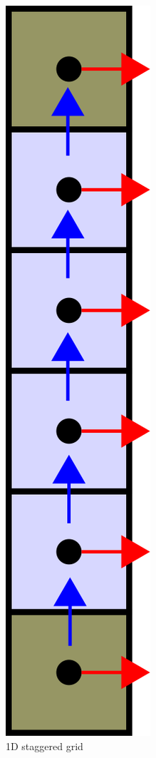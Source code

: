 \documentclass[12pt]{article}
\begin{document}
\begin{figure}[H]
    \includegraphics[height=0.5\textheight]{../../media/1d-NS}
    \caption{1D staggered grid}
    \label{fig:1d-grid}
\end{figure}
\end{document}

